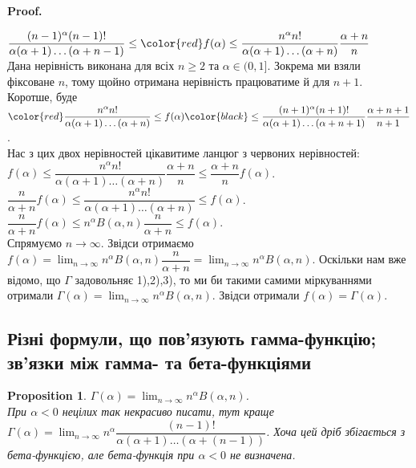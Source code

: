 \documentclass[a4paper, 10pt]{article}
\makeatletter
\def\qed{$\blacksquare$}
\theoremstyle{theoremdd}
\theoremstyle{theoremdd}
\theoremstyle{theoremdd}
\theoremstyle{theoremdd}
\theoremstyle{theoremdd}
\theoremstyle{theoremdd}
\newtheorem{proposition}[theorem]{Proposition}
\theoremstyle{theoremdd}
\theoremstyle{theoremdd}
\theoremstyle{theoremdd}
\renewenvironment{proof}[1][Proof.\\]{\par
\pushQED{\hfill \qed}%
\normalfont \topsep6\p@\@plus6\p@\relax
\trivlist
\item\relax
{\bfseries
#1\@addpunct{.}}\hspace\labelsep\ignorespaces
}{%
\popQED\endtrivlist\@endpefalse
}
\makeatother
\begin{document}
\begin{proof}
$\dfrac{(n-1)^\alpha (n-1)!}{\alpha (\alpha+1) \dots (\alpha+n-1)} \leq \color{red}f(\alpha) \leq \dfrac{n^\alpha n!}{\alpha (\alpha+1) \dots (\alpha+n)} \dfrac{\alpha + n}{n}$\\
Дана нерівність виконана для всіх $n \geq 2$ та $\alpha \in (0,1]$. Зокрема ми взяли фіксоване $n$, тому щойно отримана нерівність працюватиме й для $n+1$. Коротше, буде\\
$\color{red}\dfrac{n^\alpha n!}{\alpha (\alpha+1) \dots (\alpha+n)} \leq f(\alpha) \color{black}\leq \dfrac{(n+1)^\alpha (n+1)!}{\alpha (\alpha+1) \dots (\alpha+n+1)} \dfrac{\alpha + n+1}{n+1}$.\\
Нас з цих двох нерівностей цікавитиме ланцюг з червоних нерівностей:\\
$f(\alpha) \leq \dfrac{n^\alpha n!}{\alpha (\alpha+1)\dots (\alpha+n)} \dfrac{\alpha+n}{n} \leq \dfrac{\alpha+n}{n}f(\alpha)$.\\
$\dfrac{n}{\alpha+n} f(\alpha) \leq \dfrac{n^\alpha n!}{\alpha (\alpha+1) \dots (\alpha+n)} \leq f(\alpha)$.\\
$\dfrac{n}{\alpha+n} f(\alpha) \leq n^\alpha B(\alpha,n) \dfrac{n}{\alpha+n} \leq f(\alpha)$.\\
Спрямуємо $n \to \infty$. Звідси отримаємо $f(\alpha) = \displaystyle\lim_{n \to \infty} n^\alpha B(\alpha,n) \dfrac{n}{\alpha+n} = \lim_{n \to \infty} n^\alpha B(\alpha,n)$. Оскільки нам вже відомо, що $\Gamma$ задовольняє 1),2),3), то ми би такими самими міркуваннями отримали $\Gamma(\alpha) = \displaystyle\lim_{n \to \infty} n^\alpha B(\alpha,n)$. Звідси отримали $f(\alpha) = \Gamma(\alpha)$.
\end{proof}

\subsection{Різні формули, що пов'язують гамма-функцію; зв'язки між гамма- та бета-функціями}
\begin{proposition}
$\Gamma(\alpha) = \displaystyle\lim_{n \to \infty} n^\alpha B(\alpha,n)$.\\
\textit{При $\alpha < 0$ нецілих так некрасиво писати, тут краще $\Gamma(\alpha) = \displaystyle\lim_{n \to \infty} n^\alpha \dfrac{(n-1)!}{\alpha(\alpha+1) \dots (\alpha+(n-1))}$. Хоча цей дріб збігається з бета-функцією, але бета-функція при $\alpha <0$ не визначена.}
\end{proposition}
\end{document}
